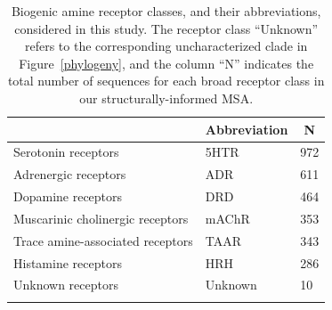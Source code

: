 \documentclass[fleqn,10pt]{wlpeerj}
\begin{document}
\vspace*{5cm}


\begin{table}[htbp]
	\centering
	\begin{tabular}{l l l}
		\hline\noalign{\smallskip}
		\multicolumn{1}{c}{Receptor Class} & \multicolumn{1}{c}{Abbreviation} & \multicolumn{1}{c}{N} \\
		\hline\noalign{\smallskip}
		Serotonin receptors & \quad 5HTR & 972  \\
		Adrenergic receptors & \quad ADR & 611  \\
		Dopamine receptors & \quad DRD & 464 \\
		Muscarinic cholinergic receptors & \quad mAChR & 353  \\
		Trace amine-associated receptors & \quad TAAR & 343 \\
		Histamine receptors & \quad HRH & 286 \\
		Unknown receptors & \quad Unknown & 10 \\
		\noalign{\smallskip}\hline\noalign{\smallskip} 
	\end{tabular}
	\caption{\label{tab:abbrev_count} Biogenic amine receptor classes, and their abbreviations, considered in this study. The receptor class ``Unknown'' refers to the corresponding uncharacterized clade in Figure~\ref{phylogeny}, and the column ``N'' indicates the total number of sequences for each broad receptor class in our structurally-informed MSA.}
\end{table}




\newpage
\end{document}
